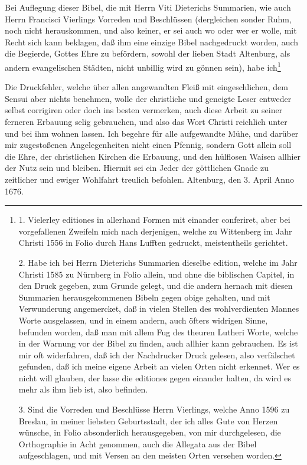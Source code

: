 Bei Auflegung dieser Bibel, die mit Herrn Viti Dieterichs Summarien, wie auch Herrn Francisci Vierlings Vorreden und Beschlüssen (dergleichen sonder Ruhm, noch nicht herauskommen, und also keiner, er sei auch wo oder wer er wolle, mit Recht sich kann beklagen, daß ihm eine einzige Bibel nachgedruckt worden, auch die Begierde, Gottes Ehre zu befördern, sowohl der lieben Stadt Altenburg, als andern evangelischen Städten, nicht unbillig wird zu gönnen sein), habe ich\footnote{1. Vielerley editiones in allerhand Formen mit einander conferiret, aber bei vorgefallenen Zweifeln mich nach derjenigen, welche zu Wittenberg im Jahr Christi 1556 in Folio durch Hans Lufften gedruckt, meistentheils gerichtet.\par 2. Habe ich bei Herrn Dieterichs Summarien dieselbe edition, welche im Jahr Christi 1585 zu Nürnberg in Folio allein, und ohne die biblischen Capitel, in den Druck gegeben, zum Grunde gelegt, und die andern hernach mit diesen Summarien herausgekommenen Bibeln gegen obige gehalten, und mit Verwunderung angemercket, daß in vielen Stellen des wohlverdienten Mannes Worte ausgelassen, und in einem andern, auch öfters widrigen Sinne, befunden worden, daß man mit allem Fug des theuren Lutheri Worte, welche in der Warnung vor der Bibel zu finden, auch allhier kann gebrauchen. Es ist mir oft widerfahren, daß ich der Nachdrucker Druck gelesen, also verfälschet gefunden, daß ich meine eigene Arbeit an vielen Orten nicht erkennet. Wer es nicht will glauben, der lasse die editiones gegen einander halten, da wird es mehr als ihm lieb ist, also befinden.\par 3. Sind die Vorreden und Beschlüsse Herrn Vierlings, welche Anno 1596 zu Breslau, in meiner liebsten Geburtsstadt, der ich alles Gute von Herzen wünsche, in Folio absonderlich herausgegeben, von mir durchgelesen, die Orthographie in Acht genommen, auch die Allegata aus der Bibel aufgeschlagen, und mit Versen an den meisten Orten versehen worden.}

Die Druckfehler, welche über allen angewandten Fleiß mit eingeschlichen, dem Sensui aber nichts benehmen, wolle der christliche und geneigte Leser entweder selbst corrigiren oder doch ins besten vermerken, auch diese Arbeit zu seiner ferneren Erbauung selig gebrauchen, und also das Wort Christi reichlich unter und bei ihm wohnen lassen. Ich begehre für alle aufgewandte Mühe, und darüber mir zugestoßenen Angelegenheiten nicht einen Pfennig, sondern Gott allein soll die Ehre, der christlichen Kirchen die Erbauung, und den hülflosen Waisen allhier der Nutz sein und bleiben. Hiermit sei ein Jeder der göttlichen Gnade zu zeitlicher und ewiger Wohlfahrt treulich befohlen. Altenburg, den 3. April Anno 1676.

